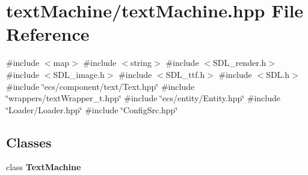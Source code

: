 \section{text\+Machine/text\+Machine.hpp File Reference}
\label{text_machine_8hpp}
{\ttfamily \#include $<$map$>$}\newline
{\ttfamily \#include $<$string$>$}\newline
{\ttfamily \#include $<$S\+D\+L\+\_\+render.\+h$>$}\newline
{\ttfamily \#include $<$S\+D\+L\+\_\+image.\+h$>$}\newline
{\ttfamily \#include $<$S\+D\+L\+\_\+ttf.\+h$>$}\newline
{\ttfamily \#include $<$S\+D\+L.\+h$>$}\newline
{\ttfamily \#include \char`\"{}ecs/component/text/\+Text.\+hpp\char`\"{}}\newline
{\ttfamily \#include \char`\"{}wrappers/text\+Wrapper\+\_\+t.\+hpp\char`\"{}}\newline
{\ttfamily \#include \char`\"{}ecs/entity/\+Entity.\+hpp\char`\"{}}\newline
{\ttfamily \#include \char`\"{}Loader/\+Loader.\+hpp\char`\"{}}\newline
{\ttfamily \#include \char`\"{}Config\+Src.\+hpp\char`\"{}}\newline
\subsection*{Classes}
\begin{DoxyCompactItemize}
\item 
class \textbf{ Text\+Machine}
\end{DoxyCompactItemize}
